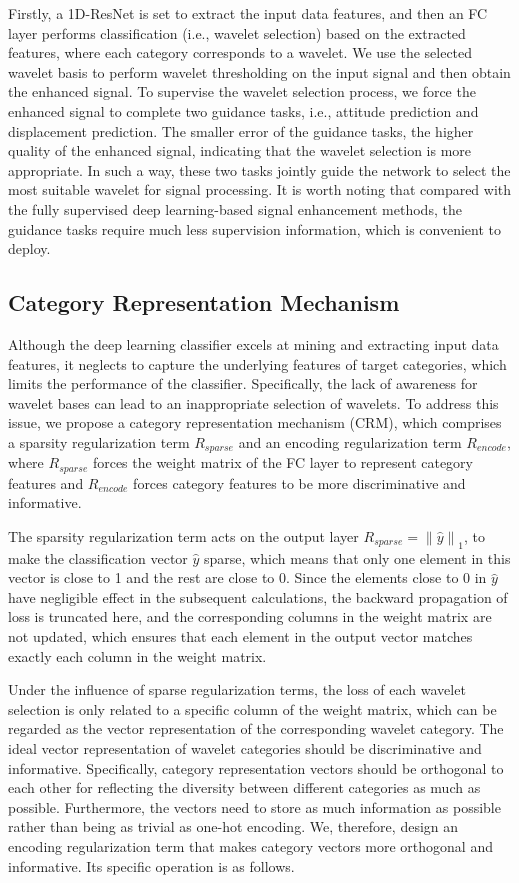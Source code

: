 \documentclass[letterpaper]{article}
\begin{document}
Firstly, a 1D-ResNet is set to extract the input data features, and then an FC layer performs classification (i.e., wavelet selection) based on the extracted features, where each category corresponds to a wavelet. We use the selected wavelet basis to perform wavelet thresholding on the input signal and then obtain the enhanced signal. To supervise the wavelet selection process, we force the enhanced signal to complete two guidance tasks, i.e., attitude prediction and displacement prediction. The smaller error of the guidance tasks, the higher quality of the enhanced signal, indicating that the wavelet selection is more appropriate. In such a way, these two tasks jointly guide the network to select the most suitable wavelet for signal processing. It is worth noting that compared with the fully supervised deep learning-based signal enhancement methods, the guidance tasks require much less supervision information, which is convenient to deploy.


\subsection{Category Representation Mechanism}
Although the deep learning classifier excels at mining and extracting input data features, it neglects to capture the underlying features of target categories, which limits the performance of the classifier. Specifically, the lack of awareness for wavelet bases can lead to an inappropriate selection of wavelets.
To address this issue, we propose a category representation mechanism (CRM), which comprises a sparsity regularization term $R_{sparse}$ and an encoding regularization term $R_{encode}$, where $R_{sparse}$ forces the weight matrix of the FC layer to represent category features and $R_{encode}$ forces category features to be more discriminative and informative.

The sparsity regularization term acts on the output layer ${R_{sparse}} = {\left\| {\hat y} \right\|_1}$, to make the classification vector $\hat{y}$ sparse, which means that only one element in this vector is close to 1 and the rest are close to 0.
Since the elements close to 0 in $\hat{y}$ have negligible effect in the subsequent calculations, the backward propagation of loss is truncated here, and the corresponding columns in the weight matrix are not updated, which ensures that each element in the output vector matches exactly each column in the weight matrix.


Under the influence of sparse regularization terms, the loss of each wavelet selection is only related to a specific column of the weight matrix, which can be regarded as the vector representation of the corresponding wavelet category. The ideal vector representation of wavelet categories should be discriminative and informative. Specifically, category representation vectors should be orthogonal to each other for reflecting the diversity between different categories as much as possible. Furthermore, the vectors need to store as much information as possible rather than being as trivial as one-hot encoding.
We, therefore, design an encoding regularization term that makes category vectors more orthogonal and informative. Its specific operation is as follows.
\end{document}
